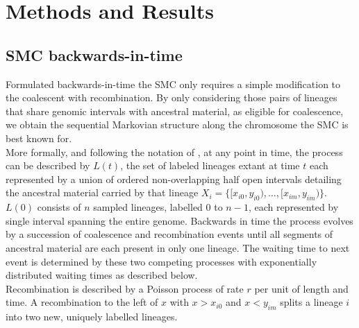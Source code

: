 \documentclass{article}
\begin{document}




\section{Methods and Results}
\subsection{SMC backwards-in-time}\label{par:description}

Formulated backwards-in-time the SMC \citep{mcvean_approximating_2005} only requires a simple modification to the 
coalescent with recombination. By only considering those pairs of 
lineages that share 
genomic intervals with ancestral material, as eligible for coalescence, we obtain the 
sequential Markovian structure along the chromosome the SMC is best known for.\\

More formally, and following the notation of \citet{mcvean_approximating_2005}, at any 
point in time, the process can be described by $L(t)$, the set of labeled lineages 
extant at time $t$ each represented by a union of ordered non-overlapping half open 
intervals detailing the ancestral material 
carried by that lineage $X_i = \{[x_{i0}, y_{i0}), \dotsc, [x_{im}, y_{im})\}$.
$L(0)$ consists of $n$ sampled lineages, labelled $0$ to $n-1$, each represented by 
single interval spanning the entire genome.
Backwards in time the process evolves by a succession of coalescence and recombination 
events until all segments of ancestral material are each present in only one lineage. 
The waiting time to next event is determined by these two competing processes with exponentially 
distributed waiting times as described below.\\

Recombination is described by a Poisson process of rate $r$ per unit of length and time. 
A recombination to the 
left of $x$ with $x>x_{i0}$ and $x<y_{im}$ splits a lineage $i$ into two new, uniquely 
labelled lineages.\\
\end{document}
